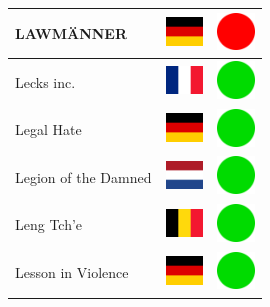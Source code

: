\documentclass[12pt, a4paper, twoside]{report}
\begin{document}
\begin{center}
\begin{longtable}{|p{5cm}|p{2cm}|p{2cm}|}
LAWMÄNNER & \includegraphics[width=1cm]{4x3/de} & \includegraphics[width=1cm]{likes/n} \\ \hline
Lecks inc. & \includegraphics[width=1cm]{4x3/fr} & \includegraphics[width=1cm]{likes/y} \\ \hline
Legal Hate & \includegraphics[width=1cm]{4x3/de} & \includegraphics[width=1cm]{likes/y} \\ \hline
Legion of the Damned & \includegraphics[width=1cm]{4x3/nl} & \includegraphics[width=1cm]{likes/y} \\ \hline
Leng Tch'e & \includegraphics[width=1cm]{4x3/be} & \includegraphics[width=1cm]{likes/y} \\ \hline
Lesson in Violence & \includegraphics[width=1cm]{4x3/de} & \includegraphics[width=1cm]{likes/y} \\ \hline

\end{longtable}
\end{center}
\end{document}

